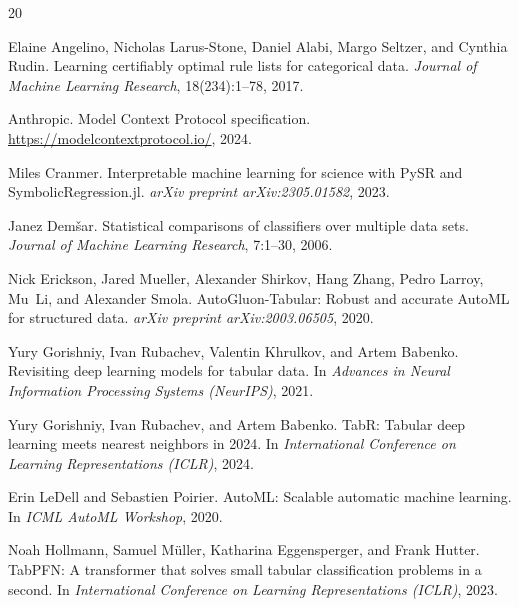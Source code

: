 \documentclass[11pt]{article}
\begin{document}
\begin{thebibliography}{20}

Elaine Angelino, Nicholas Larus-Stone, Daniel Alabi, Margo Seltzer, and
  Cynthia Rudin.
\newblock Learning certifiably optimal rule lists for categorical data.
\newblock \emph{Journal of Machine Learning Research}, 18(234):1--78, 2017.

Anthropic.
\newblock Model Context Protocol specification.
\newblock \url{https://modelcontextprotocol.io/}, 2024.

Miles Cranmer.
\newblock Interpretable machine learning for science with {PySR} and
  {SymbolicRegression.jl}.
\newblock \emph{arXiv preprint arXiv:2305.01582}, 2023.

Janez Dem\v{s}ar.
\newblock Statistical comparisons of classifiers over multiple data sets.
\newblock \emph{Journal of Machine Learning Research}, 7:1--30, 2006.

Nick Erickson, Jared Mueller, Alexander Shirkov, Hang Zhang, Pedro Larroy,
  Mu~Li, and Alexander Smola.
\newblock Auto{G}luon-{T}abular: Robust and accurate {AutoML} for structured
  data.
\newblock \emph{arXiv preprint arXiv:2003.06505}, 2020.

Yury Gorishniy, Ivan Rubachev, Valentin Khrulkov, and Artem Babenko.
\newblock Revisiting deep learning models for tabular data.
\newblock In \emph{Advances in Neural Information Processing Systems (NeurIPS)}, 2021.

Yury Gorishniy, Ivan Rubachev, and Artem Babenko.
\newblock Tab{R}: Tabular deep learning meets nearest neighbors in 2024.
\newblock In \emph{International Conference on Learning Representations (ICLR)}, 2024.

Erin LeDell and Sebastien Poirier.
 {AutoML}: Scalable automatic machine learning.
\newblock In \emph{ICML AutoML Workshop}, 2020.

Noah Hollmann, Samuel M{\"u}ller, Katharina Eggensperger, and Frank Hutter.
\newblock Tab{PFN}: A transformer that solves small tabular classification
  problems in a second.
\newblock In \emph{International Conference on Learning Representations (ICLR)}, 2023.


\end{thebibliography}
\end{document}
